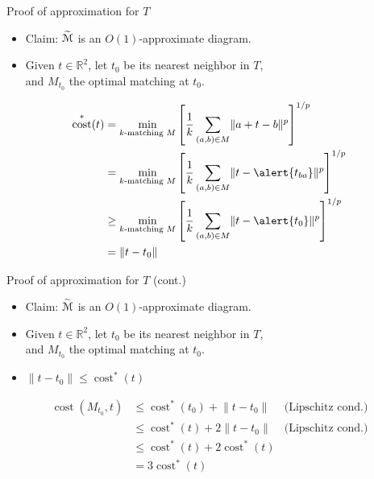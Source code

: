 \documentclass[xcolor={dvipsnames,usenames}]{beamer}
\newcommand{\reals}{\mathbb{R}}
\def\norm#1{\mathopen\| #1 \mathclose\|}	%
\DeclareMathOperator{\cost}{cost}
\newcommand{\tildeM}{\widetilde{\EuScript{M}}}
\begin{document}
\begin{frame}{Proof of approximation for $T$}
\begin{itemize}
\item Claim: $\tildeM$ is an $O(1)$-approximate diagram.
\item Given $t \in \reals^2$, let $t_0$ be its nearest neighbor in $T$,\\
	and $M_{t_0}$ the optimal matching at $t_0$.
\end{itemize}
\begin{equation*}
\begin{aligned}
\cost^*(t) &= \min_{\text{$k$-matching $M$}} \left[\frac{1}{k}\sum_{(a, b) \in M}\norm{a+t-b}^p\right]^{1/p} \\
	&= \min_{\text{$k$-matching $M$}} \left[\frac{1}{k}\sum_{(a, b) \in M}\norm{t - \alert{t_{ba}}}^p\right]^{1/p} \\
	&\geq \min_{\text{$k$-matching $M$}} \left[\frac{1}{k}\sum_{(a, b) \in M}\norm{t - \alert{t_0}}^p\right]^{1/p} \\
	&= \norm{t - t_0}
\end{aligned}
\end{equation*}
\end{frame}

\begin{frame}{Proof of approximation for $T$ (cont.)}
\begin{itemize}
\item Claim: $\tildeM$ is an $O(1)$-approximate diagram.
\item Given $t \in \reals^2$, let $t_0$ be its nearest neighbor in $T$,\\
	and $M_{t_0}$ the optimal matching at $t_0$.
\item $\norm{t - t_0} \leq \cost^*(t)$
\end{itemize}
\begin{equation*}
\begin{aligned}
\cost(M_{t_0}, t) &\leq \cost^*(t_0) + \norm{t - t_0} & \text{(Lipschitz cond.)}\\
	&\leq \cost^*(t) + 2\norm{t - t_0} & \text{(Lipschitz cond.)}\\
	&\leq \cost^*(t) + 2\cost^*(t) \\
	&= 3\cost^*(t)
\end{aligned}
\end{equation*}
\end{frame}
\end{document}
